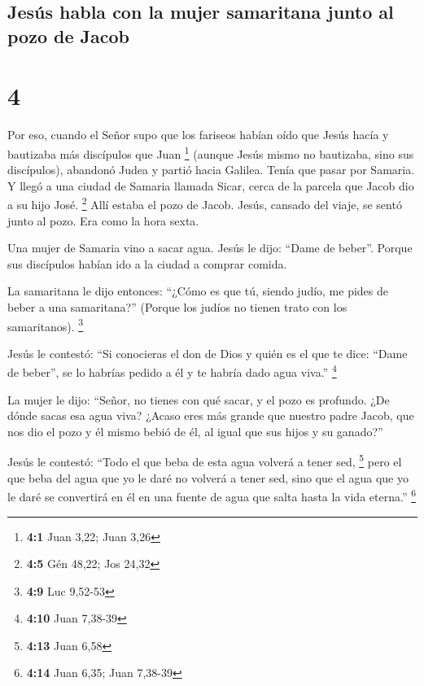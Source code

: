 \hypertarget{jesuxfas-habla-con-la-mujer-samaritana-junto-al-pozo-de-jacob}{%
\subsection{Jesús habla con la mujer samaritana junto al pozo de
Jacob}\label{jesuxfas-habla-con-la-mujer-samaritana-junto-al-pozo-de-jacob}}

\hypertarget{section-3}{%
\section{4}\label{section-3}}

 Por eso, cuando el Señor supo que los fariseos habían
oído que Jesús hacía y bautizaba más discípulos que Juan \footnote{\textbf{4:1}
  Juan 3,22; Juan 3,26}  (aunque Jesús mismo no bautizaba,
sino sus discípulos),  abandonó Judea y partió hacia
Galilea.  Tenía que pasar por Samaria.  Y
llegó a una ciudad de Samaria llamada Sicar, cerca de la parcela que
Jacob dio a su hijo José. \footnote{\textbf{4:5} Gén 48,22; Jos 24,32}
 Allí estaba el pozo de Jacob. Jesús, cansado del viaje,
se sentó junto al pozo. Era como la hora sexta.

 Una mujer de Samaria vino a sacar agua. Jesús le dijo:
``Dame de beber''.  Porque sus discípulos habían ido a la
ciudad a comprar comida.

 La samaritana le dijo entonces: ``¿Cómo es que tú, siendo
judío, me pides de beber a una samaritana?'' (Porque los judíos no
tienen trato con los samaritanos). \footnote{\textbf{4:9} Luc 9,52-53}

 Jesús le contestó: ``Si conocieras el don de Dios y
quién es el que te dice: ``Dame de beber'', se lo habrías pedido a él y
te habría dado agua viva.'' \footnote{\textbf{4:10} Juan 7,38-39}

 La mujer le dijo: ``Señor, no tienes con qué sacar, y el
pozo es profundo. ¿De dónde sacas esa agua viva?  ¿Acaso
eres más grande que nuestro padre Jacob, que nos dio el pozo y él mismo
bebió de él, al igual que sus hijos y su ganado?''

 Jesús le contestó: ``Todo el que beba de esta agua
volverá a tener sed, \footnote{\textbf{4:13} Juan 6,58} 
pero el que beba del agua que yo le daré no volverá a tener sed, sino
que el agua que yo le daré se convertirá en él en una fuente de agua que
salta hasta la vida eterna.'' \footnote{\textbf{4:14} Juan 6,35; Juan
  7,38-39}

